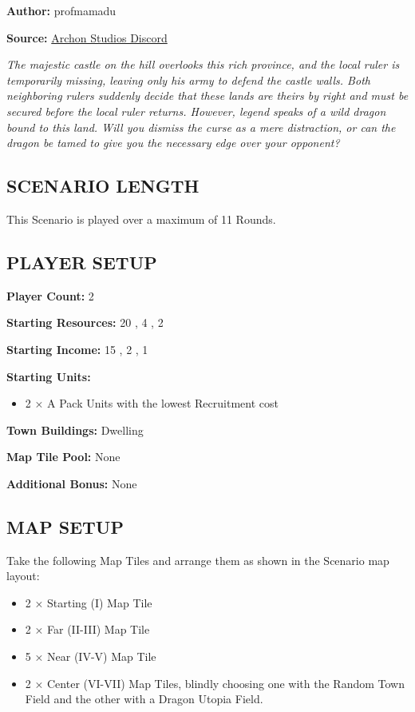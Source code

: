 
\begin{multicols*}{2}

\textbf{Author:} profmamadu

\textbf{Source:} \href{https://discord.com/channels/740870068178649108/1253016693517717714/1253016693517717714}{Archon Studios Discord}

\textit{The majestic castle on the hill overlooks this rich province, and the local ruler is temporarily missing, leaving only his army to defend the castle walls.
Both neighboring rulers suddenly decide that these lands are theirs by right and must be secured before the local ruler returns.
However, legend speaks of a wild dragon bound to this land.
Will you dismiss the curse as a mere distraction, or can the dragon be tamed to give you the necessary edge over your opponent?
}

\subsection*{\MakeUppercase{Scenario Length}}

This Scenario is played over a maximum of 11 Rounds.

\subsection*{\MakeUppercase{Player Setup}}

\textbf{Player Count:} 2

\textbf{Starting Resources:} 20 , 4 , 2 

\textbf{Starting Income:} 15 , 2 , 1 

\textbf{Starting Units:}
\begin{itemize}
  \item 2 × A Pack  Units with the lowest Recruitment cost
\end{itemize}

\textbf{Town Buildings:}  Dwelling

\textbf{Map Tile Pool:} None

\textbf{Additional Bonus:} None

\subsection*{\MakeUppercase{Map Setup}}
Take the following Map Tiles and arrange them as shown in the Scenario map layout:
\begin{itemize}
  \item 2 × Starting (I) Map Tile
  \item 2 × Far (II-III) Map Tile
  \item 5 × Near (IV-V) Map Tile
  \item 2 × Center (VI-VII) Map Tiles, blindly choosing one with the Random Town Field and the other with a Dragon Utopia Field.
\end{itemize}


\end{multicols*}
